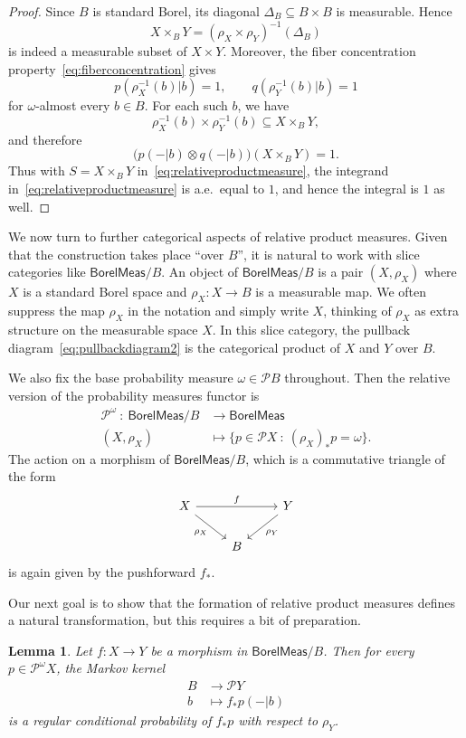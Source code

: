 \documentclass[11pt,a4paper]{scrartcl}
\newcommand{\borelmeas}{\mathsf{BorelMeas}}
\newcommand{\giry}{\mathcal{P}}
\newtheorem{lem}[theo]{Lemma}
\theoremstyle{definition}
\begin{document}
\begin{proof}
	Since $B$ is standard Borel, its diagonal $\Delta_B \subseteq B \times B$ is measurable. Hence
	\[
		X \times_B Y = (\rho_X \times \rho_Y)^{-1}(\Delta_B)
	\]
	is indeed a measurable subset of $X \times Y$.
	Moreover, the fiber concentration property~\eqref{eq:fiberconcentration} gives
	\[
		p(\rho_X^{-1}(b)|b) = 1,
		\qquad
		q(\rho_Y^{-1}(b)|b) = 1
	\]
	for $\omega$-almost every $b \in B$.
	For each such $b$, we have
	\[
		\rho_X^{-1}(b) \times \rho_Y^{-1}(b) \subseteq X \times_B Y,
	\]
	and therefore
	\[
		\bigl(p(-|b) \otimes q(-|b)\bigr)(X \times_B Y) = 1.
	\]
	Thus with $S = X \times_B Y$ in~\eqref{eq:relativeproductmeasure}, the integrand in~\eqref{eq:relativeproductmeasure} is a.e.~equal to $1$,
	and hence the integral is $1$ as well.
\end{proof}

We now turn to further categorical aspects of relative product measures.
Given that the construction takes place ``over $B$'', it is natural to work with slice categories like $\borelmeas/B$.
An object of $\borelmeas/B$ is a pair $(X, \rho_X)$ where $X$ is a standard Borel space and $\rho_X: X \rightarrow B$ is a measurable map.
We often suppress the map $\rho_X$ in the notation and simply write $X$, thinking of $\rho_X$ as extra structure on the measurable space $X$.
In this slice category, the pullback diagram~\eqref{eq:pullbackdiagram2} is the categorical product of $X$ and $Y$ over $B$.

We also fix the base probability measure $\omega \in \giry B$ throughout.
Then the relative version of the probability measures functor is
\begin{align*}
	\giry^\omega \: : \: \borelmeas/B & \longrightarrow \borelmeas \\
	(X, \rho_X) & \longmapsto \{ p \in \giry X \: : \: (\rho_X)_\ast p = \omega \}.
\end{align*}
The action on a morphism of $\borelmeas/B$, which is a commutative triangle of the form
\[
	\begin{tikzcd}
		X \arrow[rr, "f"] \arrow[dr, "\rho_X"'] & & Y \arrow[dl, "\rho_Y"] \\
		& B &
	\end{tikzcd}
\]
is again given by the pushforward $f_\ast$.

Our next goal is to show that the formation of relative product measures defines a natural transformation,
but this requires a bit of preparation.

\begin{lem}\label{lem:pushforwarddisintegration}
  Let $f : X \to Y$ be a morphism in $\borelmeas/B$.
	Then for every $p \in \giry^\omega X$, the Markov kernel
	\begin{align*}
		B & \longrightarrow \giry Y \\
		b & \longmapsto f_\ast p(-|b)
	\end{align*}
	is a regular conditional probability of $f_\ast p$ with respect to $\rho_Y$.
\end{lem}
\end{document}
